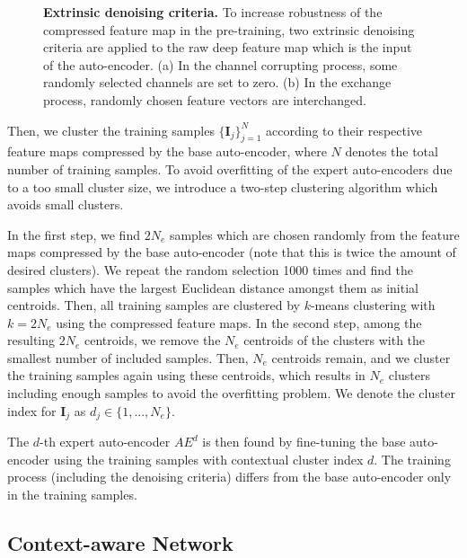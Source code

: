 \documentclass[10pt,twocolumn,letterpaper]{article}
\begin{document}
\begin{figure}[t]
    \hfill
    \caption{\textbf{Extrinsic denoising criteria.} To increase robustness of the compressed feature map in the pre-training, two extrinsic denoising criteria are applied to the raw deep feature map which is the input of the auto-encoder. (a) In the channel corrupting process, some randomly selected channels are set to zero. (b) In the exchange process, randomly chosen feature vectors are interchanged.}
    \label{fig:denoising}
    \vspace{-0.4cm}
\end{figure}

Then, we cluster the training samples $\{ \mathbf{I}_j \}_{j=1}^N$ according to their respective feature maps compressed by the base auto-encoder, where $N$ denotes the total number of training samples.
To avoid overfitting of the expert auto-encoders due to a too small cluster size, we introduce a two-step clustering algorithm which avoids small clusters.

In the first step, we find $2N_e$ samples which are chosen randomly from the feature maps compressed by the base auto-encoder (note that this is twice the amount of desired clusters). 
We repeat the random selection 1000 times and find the samples which have the largest Euclidean distance amongst them as initial centroids.
Then, all training samples are clustered by $k$-means clustering with $k = 2N_e$ using the compressed feature maps. 
In the second step, among the resulting $2N_e$ centroids, we remove the $N_e$ centroids of the clusters with the smallest number of included samples. 
Then, $N_e$ centroids remain, and we cluster the training samples again using these centroids, which results in $N_e$ clusters including enough samples to avoid the overfitting problem.
We denote the cluster index for $\mathbf{I}_j$ as $d_j\in\{1,...,N_e\}$.

The $d$-th expert auto-encoder $AE^d$ is then found by fine-tuning the base auto-encoder using the training samples with contextual cluster index $d$.
The training process (including the denoising criteria) differs from the base auto-encoder only in the training samples.
 \subsection{Context-aware Network} \label{sec:contextnet}
\end{document}
